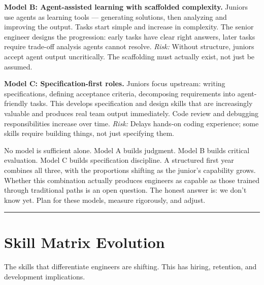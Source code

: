 \documentclass[
  a4paper,
  DIV=11,
  numbers=noendperiod]{scrreprt}
\begin{document}
\textbf{Model B: Agent-assisted learning with scaffolded complexity.}
Juniors use agents as learning tools --- generating solutions, then
analyzing and improving the output. Tasks start simple and increase in
complexity. The senior engineer designs the progression: early tasks
have clear right answers, later tasks require trade-off analysis agents
cannot resolve. \emph{Risk:} Without structure, juniors accept agent
output uncritically. The scaffolding must actually exist, not just be
assumed.

\textbf{Model C: Specification-first roles.} Juniors focus upstream:
writing specifications, defining acceptance criteria, decomposing
requirements into agent-friendly tasks. This develops specification and
design skills that are increasingly valuable and produces real team
output immediately. Code review and debugging responsibilities increase
over time. \emph{Risk:} Delays hands-on coding experience; some skills
require building things, not just specifying them.

No model is sufficient alone. Model A builds judgment. Model B builds
critical evaluation. Model C builds specification discipline. A
structured first year combines all three, with the proportions shifting
as the junior's capability grows. Whether this combination actually
produces engineers as capable as those trained through traditional paths
is an open question. The honest answer is: we don't know yet. Plan for
these models, measure rigorously, and adjust.

\begin{center}\rule{0.5\linewidth}{0.5pt}\end{center}

\section{Skill Matrix Evolution}\label{skill-matrix-evolution}

The skills that differentiate engineers are shifting. This has hiring,
retention, and development implications.
\end{document}
